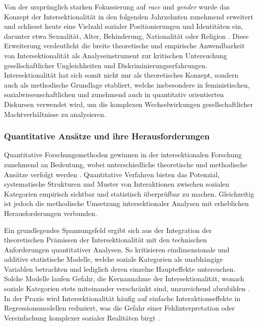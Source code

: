 Von der ursprünglich starken Fokussierung auf \textit{race} und \textit{gender} wurde das Konzept der Intersektionalität in den folgenden Jahrzehnten zunehmend erweitert und schliesst heute eine Vielzahl sozialer Positionierungen und Identitäten ein, darunter etwa Sexualität, Alter, Behinderung, Nationalität oder Religion \parencite{bauerIntersectionalityQuantitativeResearch2021, bowlegInvitedReflectionQuantifying2016}. Diese Erweiterung verdeutlicht die breite theoretische und empirische Anwendbarkeit von Intersektionalität als Analyseinstrument zur kritischen Untersuchung gesellschaftlicher Ungleichheiten und Diskriminierungserfahrungen. Intersektionalität hat sich somit nicht nur als theoretisches Konzept, sondern auch als methodische Grundlage etabliert, welche insbesondere in feministischen, sozialwissenschaftlichen und zunehmend auch in quantitativ orientierten Diskursen verwendet wird, um die komplexen Wechselwirkungen gesellschaftlicher Machtverhältnisse zu analysieren.


\subsubsection{Quantitative Ansätze und ihre Herausforderungen}

Quantitative Forschungsmethoden gewinnen in der intersektionalen Forschung zunehmend an Bedeutung, wobei unterschiedliche theoretische und methodische Ansätze verfolgt werden \parencite{bauerIntersectionalityQuantitativeResearch2021}. Quantitative Verfahren bieten das Potenzial, systematische Strukturen und Muster von Interaktionen zwischen sozialen Kategorien empirisch sichtbar und statistisch überprüfbar zu machen. Gleichzeitig ist jedoch die methodische Umsetzung intersektionaler Analysen mit erheblichen Herausforderungen verbunden.

Ein grundlegendes Spannungsfeld ergibt sich aus der Integration der theoretischen Prämissen der Intersektionalität mit den technischen Anforderungen quantitativer Analysen. So kritisieren \textcite{hancockWhenMultiplicationDoesnt2007} eindimensionale und additive statistische Modelle, welche soziale Kategorien als unabhängige Variablen betrachten und lediglich deren einzelne Haupteffekte untersuchen. Solche Modelle laufen Gefahr, die Kernannahme der Intersektionalität, wonach soziale Kategorien stets miteinander verschränkt sind, unzureichend abzubilden \parencite{bowlegInvitedReflectionQuantifying2016, bauerIntersectionalityQuantitativeResearch2021}. In der Praxis wird Intersektionalität häufig auf einfache Interaktionseffekte in Regressionsmodellen reduziert, was die Gefahr einer Fehlinterpretation oder Vereinfachung komplexer sozialer Realitäten birgt \parencite{bauerIntersectionalityQuantitativeResearch2021, scottIntersectionalityQuantitativeMethods2017}.

